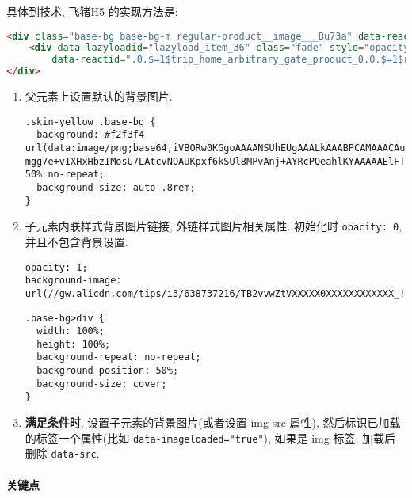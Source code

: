 具体到技术,
\href{https://h5.m.taobao.com/trip/home/index.html?_projVer=0.1.125}{飞猪H5}
的实现方法是:

\begin{lstlisting}[language=HTML]
<div class="base-bg base-bg-m regular-product__image___Bu73a" data-reactid=".0.$=1$trip_home_arbitrary_gate_product_0.0.$=1$regular_item_1.0.$=10">
    <div data-lazyloadid="lazyload_item_36" class="fade" style="opacity: 1;background-image: url(&quot;//gw.alicdn.com/tips/i3/638737216/TB2vvwZtVXXXXX0XXXXXXXXXXXX_!!638737216.jpg_400x400q75.jpg_.webp&quot;);"
        data-reactid=".0.$=1$trip_home_arbitrary_gate_product_0.0.$=1$regular_item_1.0.$=10.$=11" data-imageloaded="true"></div>
</div>
\end{lstlisting}

\begin{enumerate}
\def\labelenumi{\arabic{enumi}.}
\item
  父元素上设置默认的背景图片.

\begin{lstlisting}
.skin-yellow .base-bg {
  background: #f2f3f4 url(data:image/png;base64,iVBORw0KGgoAAAANSUhEUgAAALkAAABPCAMAAACAuJRqAAAAq1BMV…mgg7e+vIXHxHbzIMosU7LAtcvNOAUKpxf6kSUl8MPvAnj+AYRcPQeahlKYAAAAAElFTkSuQmCC) 50% no-repeat;
  background-size: auto .8rem;
}
\end{lstlisting}
\item
  子元素内联样式背景图片链接, 外链样式图片相关属性. 初始化时
  \lstinline!opacity: 0!, 并且不包含背景设置.

\begin{lstlisting}
opacity: 1;
background-image: url(//gw.alicdn.com/tips/i3/638737216/TB2vvwZtVXXXXX0XXXXXXXXXXXX_!!638737216.jpg_400x400q75.jpg_.webp);
\end{lstlisting}

\begin{lstlisting}
.base-bg>div {
  width: 100%;
  height: 100%;
  background-repeat: no-repeat;
  background-position: 50%;
  background-size: cover;
}
\end{lstlisting}
\item
  \textbf{满足条件时}, 设置子元素的背景图片(或者设置 img src 属性),
  然后标识已加载的标签一个属性(比如
  \lstinline!data-imageloaded="true"!), 如果是 img 标签, 加载后删除
  \lstinline!data-src!.
\end{enumerate}

\paragraph{关键点}\label{ux5173ux952eux70b9}

